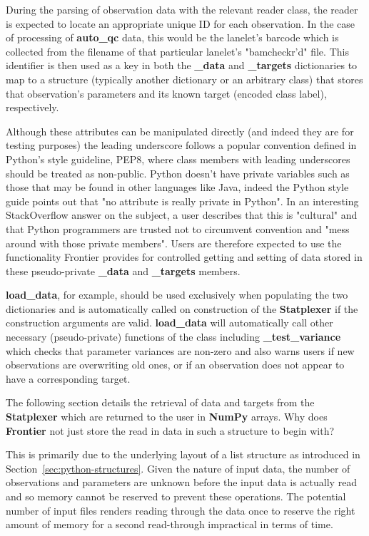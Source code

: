 During the parsing of observation data with the relevant reader class, the
reader is expected to locate an appropriate unique ID for each observation. In
the case of processing of \textbf{auto\_qc} data, this would be the lanelet's
barcode which is collected from the filename of that particular lanelet's
"bamcheckr'd" file.
This identifier is then used as a key in both the \textbf{\_data} and
\textbf{\_targets} dictionaries to map to a structure (typically another
dictionary or an arbitrary class) that stores that observation's parameters
and its known target (encoded class label), respectively.

Although these attributes can be manipulated directly (and indeed they are for
testing purposes) the leading underscore follows a popular convention defined in
Python's style guideline, PEP8\citep{pep8}, where class members with leading
underscores should be treated as non-public. Python doesn't have private
variables such as those that may be found in other languages like Java, indeed
the Python style guide points out that "no attribute is really private in
Python"\citep{pep8}. In an interesting StackOverflow answer on the subject, a
user describes that this is "cultural"\citep{so:pythonprivate} and that Python
programmers are trusted not to circumvent convention and "mess around with those
private members". Users are therefore expected to use the functionality
Frontier provides for controlled getting and setting of data stored in these
pseudo-private \textbf{\_data} and \textbf{\_targets} members.

\textbf{load\_data}, for example, should be used exclusively when populating
the two dictionaries and is automatically called on construction of the
\textbf{Statplexer} if the construction arguments are valid.
\textbf{load\_data} will automatically call other necessary (pseudo-private)
functions of the class including \textbf{\_test\_variance} which checks that
parameter variances are non-zero and also warns users if new observations
are overwriting old ones, or if an observation does not appear to have a
corresponding target.

The following section details the retrieval of data and targets from the
\textbf{Statplexer} which are returned to the user in \textbf{NumPy} arrays. Why
does \textbf{Frontier} not just store the read in data in such a structure to
begin with?

This is primarily due to the underlying layout of a list structure as introduced
in Section~\ref{sec:python-structures}. Given the nature of input data,
the number of observations and parameters are unknown before the input
data is actually read and so memory cannot be reserved to prevent these operations.
The potential number of input files renders reading through the data once to
reserve the right amount of memory for a second read-through impractical in
terms of time.

